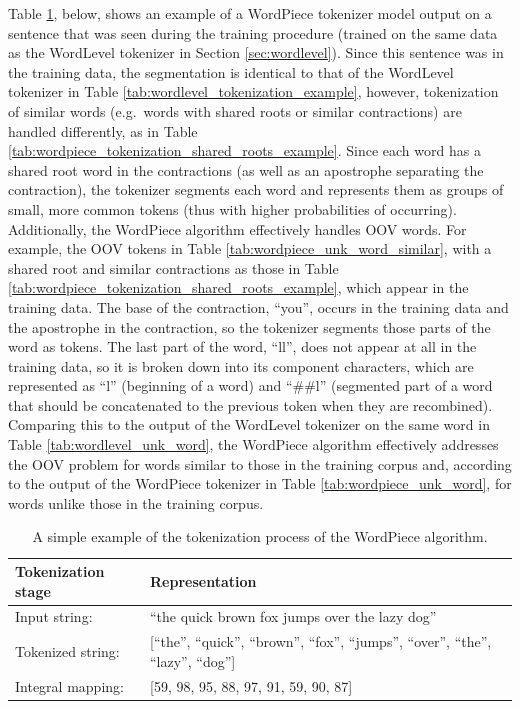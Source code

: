 \documentclass[12pt]{article}
\begin{document}
Table \ref{tab:wordpiece_tokenization_example}, below, shows an example of a WordPiece tokenizer model output on a sentence that was seen during the training procedure (trained on the same data as the WordLevel tokenizer in Section \ref{sec:wordlevel}). Since this sentence was in the training data, the segmentation is identical to that of the WordLevel tokenizer in Table \ref{tab:wordlevel_tokenization_example}, however, tokenization of similar words (e.g.~words with shared roots or similar contractions) are handled differently, as in Table \ref{tab:wordpiece_tokenization_shared_roots_example}. Since each word has a shared root word in the contractions (as well as an apostrophe separating the contraction), the tokenizer segments each word and represents them as groups of small, more common tokens (thus with higher probabilities of occurring). Additionally, the WordPiece algorithm effectively handles OOV words. For example, the OOV tokens in Table \ref{tab:wordpiece_unk_word_similar}, with a shared root and similar contractions as those in Table \ref{tab:wordpiece_tokenization_shared_roots_example}, which appear in the training data. The base of the contraction, ``you'', occurs in the training data and the apostrophe in the contraction, so the tokenizer segments those parts of the word as tokens. The last part of the word, ``ll'', does not appear at all in the training data, so it is broken down into its component characters, which are represented as ``l'' (beginning of a word) and ``\#\#l'' (segmented part of a word that should be concatenated to the previous token when they are recombined). Comparing this to the output of the WordLevel tokenizer on the same word in Table \ref{tab:wordlevel_unk_word}, the WordPiece algorithm effectively addresses the OOV problem for words similar to those in the training corpus and, according to the output of the WordPiece tokenizer in Table \ref{tab:wordpiece_unk_word}, for words unlike those in the training corpus.

\begin{table}[!t]
    \centering
    \begin{tabular}{l l}
        \toprule
        Tokenization stage & Representation                                                                            \\
        \midrule
        Input string:      & ``the quick brown fox jumps over the lazy dog''                                           \\
        Tokenized string:  & [``the'', ``quick'', ``brown'', ``fox'', ``jumps'', ``over'', ``the'', ``lazy'', ``dog''] \\
        Integral mapping:  & [59, 98, 95, 88, 97, 91, 59, 90, 87]                                                      \\
        \bottomrule
    \end{tabular}
    \caption{A simple example of the tokenization process of the WordPiece algorithm.}
    \label{tab:wordpiece_tokenization_example}
\end{table}
\end{document}

